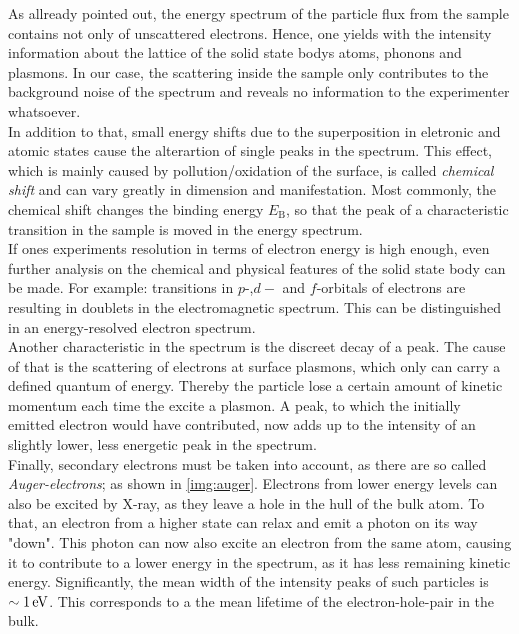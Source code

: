 \documentclass[numbers=noenddot,a4paper,notitlepage,twoside,BCOR15mm]{article}
\newcommand{\ix}[1]{_\text{#1}}
\newcommand{\tilt}[1]{\textit{#1}}
\begin{document}
		As allready pointed out, the energy spectrum of the particle flux from the sample contains not only of unscattered electrons. Hence, one yields with the intensity information about the lattice of the solid state bodys atoms, phonons and plasmons. In our case, the scattering inside the sample only contributes to the background noise of the spectrum and reveals no information to the experimenter whatsoever.\\
		In addition to that, small energy shifts due to the superposition in eletronic and atomic states cause the alterartion of single peaks in the spectrum. This effect, which is mainly caused by pollution/oxidation of the surface, is called \tilt{chemical shift} and can vary greatly in dimension and manifestation. Most commonly, the chemical shift changes the binding energy $E\ix{B}$, so that the peak of a characteristic transition in the sample is moved in the energy spectrum.\\
		If ones experiments resolution in terms of electron energy is high enough, even further analysis on the chemical and physical features of the solid state body can be made. For example: transitions in $p$-,$d-$ and $f$-orbitals of electrons are resulting in doublets in the electromagnetic spectrum. This can be distinguished in an energy-resolved electron spectrum.\\
		Another characteristic in the spectrum is the discreet decay of a peak. The cause of that is the scattering of electrons at surface plasmons, which only can carry a defined quantum of energy. Thereby the particle lose a certain amount of kinetic momentum each time the excite a plasmon. A peak, to which the initially emitted electron would have contributed, now adds up to the intensity of an slightly lower, less energetic peak in the spectrum.\\
		Finally, secondary electrons must be taken into account, as there are so called \tilt{Auger-electrons}; as shown in \autoref{img:auger}. Electrons from lower energy levels can also be excited by X-ray, as they leave a hole in the hull of the bulk atom. To that, an electron from a higher state can relax and emit a photon on its way "down". This photon can now also excite an electron from the same atom, causing it to contribute to a lower energy in the spectrum, as it has less remaining kinetic energy. Significantly, the mean width of the intensity peaks of such particles is $\sim\unit[1]{eV}$. This corresponds to a the mean lifetime of the electron-hole-pair in the bulk.
\end{document}
